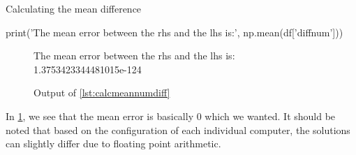 \begin{listing}[!ht]
    \caption{Calculating the mean difference}
    \label{lst:calcmeannumdiff}
    \begin{pythoncode}
        print('The mean error between the rhs and the lhs is:', np.mean(df['diffnum']))
    \end{pythoncode}
\end{listing}
\begin{figure}[!ht]
    \centering
    \caption{Output of \cref{lst:calcmeannumdiff}}
    \label{fig:calcmeannumdiffout}
    The mean error between the rhs and the lhs is: 1.3753423344481015e-124
\end{figure}

In \cref{fig:calcmeannumdiffout}, we see that the mean error is basically 0 which we wanted.
It should be noted that based on the configuration of each individual computer,
the solutions can slightly differ due to floating point arithmetic.
